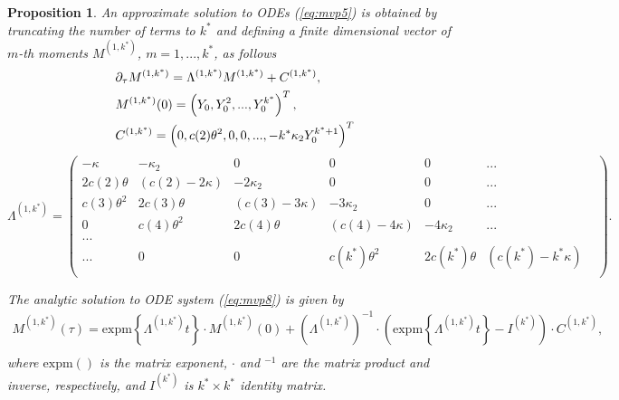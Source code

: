 \documentclass[11pt,a4paper] {article}
\newtheorem{proposition}{Proposition}[section]
\begin{document}
\begin{proposition}
An approximate solution to ODEs (\ref{eq:mvp5}) is obtained by truncating the number of terms to $k^{*}$ and defining a finite dimensional vector of $m$-th moments $M^{(1,k^{*})}$, $m=1,...,k^{*}$, as follows
\begin{equation} \label {eq:mvp8}
\begin{split}
&\partial_{\tau}M^{(1,k^{*})} =\Lambda^{(1,k^{*})} M^{(1,k^{*})}+C^{(1,k^{*})},\\
&  M^{(1,k^{*})}(0)=\left(Y_{0}, Y^{2}_{0}, ... , Y^{k^{*}}_{0} \right)^{T}, \\ 
& C^{(1,k^{*})} = \left( 0, c(2)\theta^{2}, 0, 0, ..., - k^{*}\kappa_{2}Y^{k^{*}+1}_{0}\right)^{T}\vspace*{-1\baselineskip}
\end{split}
\end{equation}
\begin{equation*}
\Lambda^{(1,k^{*})} = \begin{pmatrix}
-\kappa & -\kappa_{2} &  0 & 0& 0& ... \\
 2c(2)\theta & (c(2)- 2\kappa) &  -2\kappa_{2} & 0& 0& ...\\
c(3)\theta^{2} & 2c(3)\theta & (c(3)- 3\kappa) &  - 3\kappa_{2} & 0& ...\\
0 & c(4)\theta^{2} & 2c(4)\theta & (c(4)- 4\kappa) &   -4\kappa_{2} & ...\\
...\\
... & 0 &  0 & c(k^{*})\theta^{2} & 2c(k^{*})\theta & (c(k^{*})- k^{*}\kappa) & \\
\end{pmatrix}.
\end{equation*}




The analytic solution to ODE system (\ref{eq:mvp8}) is given by
\begin{equation} \label {eq:mvp9}
\begin{split}
M^{(1,k^{*})}(\tau) = \text{expm}\left\{\Lambda^{(1,k^{*})} t \right\} \cdot M^{(1,k^{*})}(0)+\left(\Lambda^{(1,k^{*})}\right)^{-1}\cdot\left(\text{expm}\left\{\Lambda^{(1,k^{*})} t \right\}-I^{(k^{*})}\right)\cdot C^{(1,k^{*})},\\
\end{split}
\end{equation}
where $\text{expm}()$ is the matrix exponent, $\cdot$ and $^{-1}$ are the matrix product and inverse, respectively, and $I^{(k^{*})}$ is $k^{*}\times k^{*}$ identity matrix.

\end{proposition} 
\end{document}
